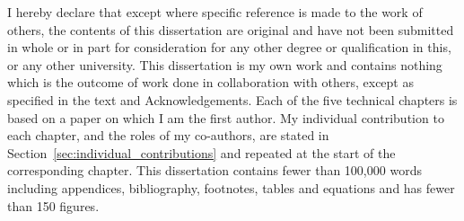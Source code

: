 
\begin{declaration}

I hereby declare that except where specific reference is made to the work of
others, the contents of this dissertation are original and have not been
submitted in whole or in part for consideration for any other degree or
qualification in this, or any other university. This dissertation is my own
work and contains nothing which is the outcome of work done in collaboration
with others, except as specified in the text and Acknowledgements. Each of the
five technical chapters is based on a paper on which I am the first author. My
individual contribution to each chapter, and the roles of my co-authors, are
stated in Section~\ref{sec:individual_contributions} and repeated at the start
of the corresponding chapter. This
dissertation contains fewer than 100,000 words including appendices, 
bibliography, footnotes, tables and equations and has fewer than 150 figures.


\end{declaration}
